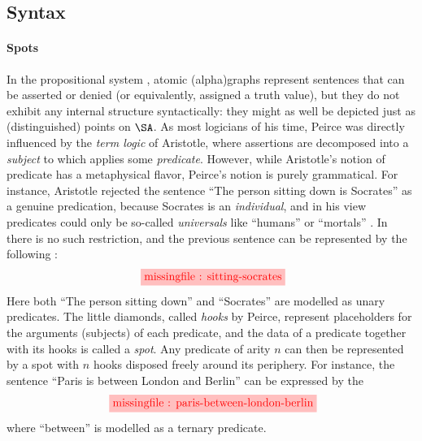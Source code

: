 \begin{scope}
\begin{scope}
\subsection{Syntax}

\paragraph{Spots} In the propositional system , atomic
\kl(alpha){graphs} represent sentences that can be asserted or denied (or
equivalently, assigned a truth value), but they do not exhibit any internal
structure syntactically: they might as well be depicted just as (distinguished)
points on $\SA$. As most logicians of his time, Peirce was directly influenced
by the \emph{term logic} of Aristotle, where assertions are decomposed into a
\emph{subject} to which applies some \emph{predicate}. However, while
Aristotle's notion of predicate has a metaphysical flavor, Peirce's notion is
purely grammatical. For instance, Aristotle rejected the sentence ``The person
sitting down is Socrates'' as a genuine predication, because Socrates is an
\emph{individual}, and in his view predicates could only be so-called
\emph{universals} like ``humans'' or ``mortals''
. In  there is no such restriction, and
the previous sentence can be represented by the following :
\begin{equation}
  \tikzfig{1}{0.5}{sitting-socrates} \label{eq:sitting-socrates}
\end{equation}
Here both ``The person sitting down'' and ``Socrates'' are modelled as unary
predicates. The little diamonds, called \emph{hooks} by Peirce, represent
placeholders for the arguments (subjects) of each predicate, and the data of a
predicate together with its hooks is called a \emph{spot}. Any predicate of arity $n$ can then be represented by a spot with
$n$ hooks disposed freely around its periphery. For instance, the sentence
``Paris is between London and Berlin'' can be expressed by the 
\begin{equation*}
  \tikzfig{1}{0.5}{paris-between-london-berlin} \label{eq:paris-between-london-berlin}
\end{equation*}
where ``between'' is modelled as a ternary predicate.


\end{scope}
\end{scope}
